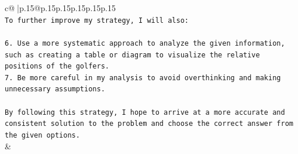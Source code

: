 \documentclass{article}
\begin{document}
{\begin{supertabular}{c@{$\;$}|p{.15\linewidth}@{}p{.15\linewidth}p{.15\linewidth}p{.15\linewidth}p{.15\linewidth}p{.15\linewidth}}
{{{\\ 
\texttt{To further improve my strategy, I will also:} \\
\\ 
\texttt{6. Use a more systematic approach to analyze the given information, such as creating a table or diagram to visualize the relative positions of the golfers.} \\
\texttt{7. Be more careful in my analysis to avoid overthinking and making unnecessary assumptions.} \\
\\ 
\texttt{By following this strategy, I hope to arrive at a more accurate and consistent solution to the problem and choose the correct answer from the given options.} \\
            }
        }
    }
    & \\ \\

\end{supertabular}
}
\end{document}

